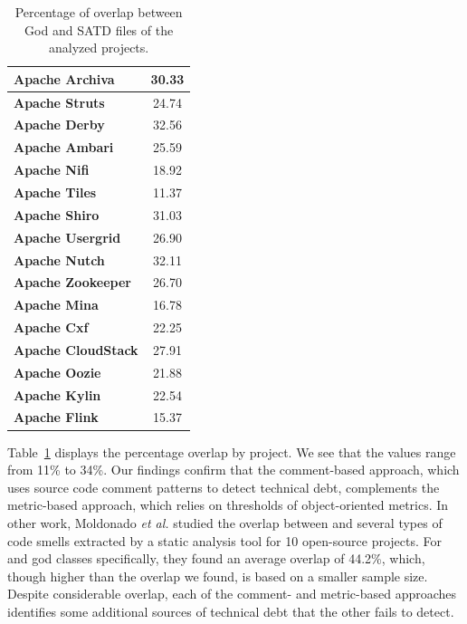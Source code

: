 {\begin{table}[!htbp]
\begin{tabular}{l|c}
		\textbf{Apache Archiva}    &    30.33     \\ \hline
		\textbf{Apache Struts}     &    24.74     \\ \hline
		\textbf{Apache Derby}      &    32.56     \\ \hline
		\textbf{Apache Ambari}     &    25.59     \\ \hline
		\textbf{Apache Nifi}       &    18.92     \\ \hline
		\textbf{Apache Tiles}      &    11.37     \\ \hline
		\textbf{Apache Shiro}      &    31.03     \\ \hline
		\textbf{Apache Usergrid}   &    26.90     \\ \hline
		\textbf{Apache Nutch}      &    32.11     \\ \hline
		\textbf{Apache Zookeeper}  &    26.70     \\ \hline
		\textbf{Apache Mina}       &    16.78     \\ \hline
		\textbf{Apache Cxf}        &    22.25     \\ \hline
		\textbf{Apache CloudStack} &    27.91     \\ \hline
		\textbf{Apache Oozie}      &    21.88     \\ \hline
		\textbf{Apache Kylin}      &    22.54     \\ \hline
		\textbf{Apache Flink}      &    15.37     \\ \hline
	\end{tabular}
	\caption{Percentage of overlap between God and SATD files of the analyzed projects.}
	\label{ch4_amount_of_overlap}
\end{table}
Table~\ref{ch4_amount_of_overlap} displays the percentage overlap by project. We see that the values range from 11\% to 34\%. Our findings confirm that the comment-based approach, which uses source code comment patterns to detect technical debt, complements the metric-based approach, which relies on thresholds of object-oriented metrics. \revision In other work, Moldonado \textit{et al.} \cite{Maldonado_TSE2017} studied the overlap between \SATD and several types of code smells extracted by a static analysis tool for 10 open-source projects. For \SATD and god classes specifically, they found an average overlap of 44.2\%, which, though higher than the overlap we found, is based on a smaller sample size. Despite considerable overlap, each of the comment- and metric-based approaches identifies some additional sources of technical debt that the other fails to detect.

}
